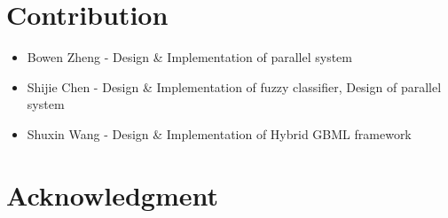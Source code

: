 \documentclass[conference]{IEEEtran}
\begin{document}
  \section{Contribution}
    \begin{itemize}
    \item Bowen Zheng - Design \& Implementation of parallel system
    \item Shijie Chen - Design \& Implementation of fuzzy classifier, Design of parallel system
    \item Shuxin Wang - Design \& Implementation of Hybrid GBML framework
    \end{itemize}
    

  \section*{Acknowledgment}




\end{document}
